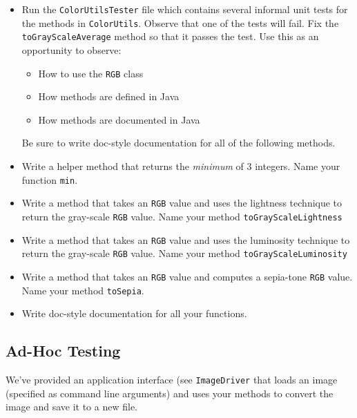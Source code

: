 \documentclass[12pt]{scrartcl}
\begin{document}
\begin{itemize}

  \item Run the \texttt{ColorUtilsTester} file which 
  contains several informal unit tests for the methods in 
  \texttt{ColorUtils}.  Observe that one of the tests
  will fail.  Fix the \texttt{toGrayScaleAverage} method so 
  that it passes the test.  Use this as an opportunity to observe:
  \begin{itemize}
    \item How to use the \texttt{RGB} class 
    \item How methods are defined in Java
    \item How methods are documented in Java
  \end{itemize}
  
  Be sure to write doc-style documentation for all of
  the following methods.
  
  \item Write a helper method that returns the \emph{minimum}
  of 3 integers.  Name your function \texttt{min}.

  \item Write a method that takes an \texttt{RGB} value and
  uses the lightness technique to return the gray-scale 
  \texttt{RGB} value.  
  Name your method \texttt{toGrayScaleLightness}

  \item Write a method that takes an \texttt{RGB} value and
  uses the luminosity technique to return the gray-scale 
  \texttt{RGB} value.  
  Name your method \texttt{toGrayScaleLuminosity}

  \item Write a method that takes an \texttt{RGB} value and
  computes a sepia-tone \texttt{RGB} value.
  Name your method \texttt{toSepia}.
  
  \item Write doc-style documentation for all your functions.
\end{itemize}

\subsection{Ad-Hoc Testing}

We've provided an application interface (see \texttt{ImageDriver}
that loads an image (specified as command line arguments) and uses your
methods to convert the image and save it to a new file.
\end{document}

